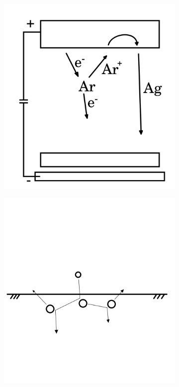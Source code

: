 \begin{figure}[tbh]
    \centering
    \begin{subfigure}[t]{.3\textwidth}
        \includegraphics[width=\textwidth]{./Pics/sputter1.png}
        \caption{}
        \label{fig:sputter0}
    \end{subfigure}
    \hspace{1cm}
    \begin{subfigure}[t]{.3\textwidth}
        \includegraphics[width=\textwidth]{./Pics/sputter2.png}

\end{subfigure}
\end{figure}
